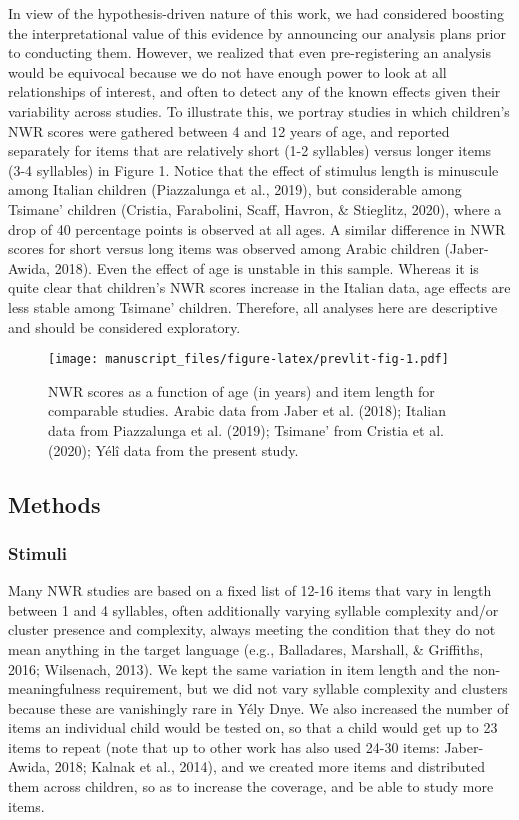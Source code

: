 \documentclass[english,,man,floatsintext]{apa6}
\begin{document}
In view of the hypothesis-driven nature of this work, we had considered
boosting the interpretational value of this evidence by announcing our
analysis plans prior to conducting them. However, we realized that even
pre-registering an analysis would be equivocal because we do not have
enough power to look at all relationships of interest, and often to
detect any of the known effects given their variability across studies.
To illustrate this, we portray studies in which children's NWR scores
were gathered between 4 and 12 years of age, and reported separately for
items that are relatively short (1-2 syllables) versus longer items (3-4
syllables) in Figure 1. Notice that the effect of stimulus length is
minuscule among Italian children (Piazzalunga et al., 2019), but
considerable among Tsimane' children (Cristia, Farabolini, Scaff,
Havron, \& Stieglitz, 2020), where a drop of 40 percentage points is
observed at all ages. A similar difference in NWR scores for short
versus long items was observed among Arabic children (Jaber-Awida,
2018). Even the effect of age is unstable in this sample. Whereas it is
quite clear that children's NWR scores increase in the Italian data, age
effects are less stable among Tsimane' children. Therefore, all analyses
here are descriptive and should be considered exploratory.

\begin{figure}
\centering
\texttt{[image: manuscript\_files/figure-latex/prevlit-fig-1.pdf]}
\caption{\label{fig:prevlit-fig}NWR scores as a function of age (in years)
and item length for comparable studies. Arabic data from Jaber et al.
(2018); Italian data from Piazzalunga et al. (2019); Tsimane' from
Cristia et al. (2020); Yélî data from the present study.}
\end{figure}

\subsection{Methods}\label{methods}

\subsubsection{Stimuli}\label{stimuli}

Many NWR studies are based on a fixed list of 12-16 items that vary in
length between 1 and 4 syllables, often additionally varying syllable
complexity and/or cluster presence and complexity, always meeting the
condition that they do not mean anything in the target language (e.g.,
Balladares, Marshall, \& Griffiths, 2016; Wilsenach, 2013). We kept the
same variation in item length and the non-meaningfulness requirement,
but we did not vary syllable complexity and clusters because these are
vanishingly rare in Yély Dnye. We also increased the number of items an
individual child would be tested on, so that a child would get up to 23
items to repeat (note that up to other work has also used 24-30 items:
Jaber-Awida, 2018; Kalnak et al., 2014), and we created more items and
distributed them across children, so as to increase the coverage, and be
able to study more items.
\end{document}
